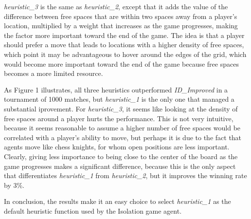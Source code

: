 \documentclass[10pt,a4paper]{article}
\begin{document}
\textit{heuristic\_3} is the same as \textit{heuristic\_2}, except that it
adds the value of the difference between free spaces that are within two spaces
away from a player's location, multiplied by a weight that increases as the game
progresses, making the factor more important toward the end of the game. The
idea is that a player should prefer a move that leads to locations with a higher
density of free spaces, which point it may be advantageous to hover around the
edges of the grid, which would become more important toward the end of the game
because free spaces becomes a more limited resource.

As Figure 1 illustrates, all three heuristics outperformed
\textit{ID\_Improved} in a tournament of 1000 matches, but \textit{heuristic\_1}
is the only one that managed a substantial iprovement. For
\textit{heuristic\_3}, it seems like looking at the density of free spaces
around a player hurts the performance. This is not very intuitive, because it
seems reasonable to assume a higher number of free spaces would be correlated
with a player's ability to move, but perhaps it is due to the fact that agents
move like chess knights, for whom open positions are less important.
Clearly, giving less importance to being close to the center of the board as
the game progresses makes a significant difference, because this is the only
aspect that differentiates \textit{heuristic\_1} from \textit{heuristic\_2},
but it improves the winning rate by 3\%.

In conclusion, the results make it an easy choice to select
\textit{heuristic\_1} as the default heuristic function used by the Isolation
game agent.
\end{document}
